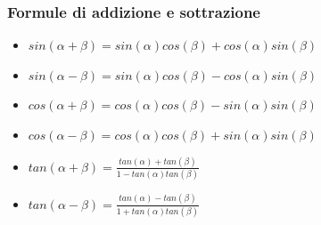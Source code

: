 \documentclass[12pt]{article}
\newenvironment{para}{\begin{adjustwidth}{13mm}{}}{\end{adjustwidth}}
\begin{document}
\begin{para}
\subsubsection{Formule di addizione e sottrazione}
\begin{itemize}
    \item $sin(\alpha + \beta) = sin(\alpha)cos(\beta)+cos(\alpha)sin(\beta)$
    \item $sin(\alpha - \beta) = sin(\alpha)cos(\beta)-cos(\alpha)sin(\beta)$
    \item $cos(\alpha+\beta) = cos(\alpha)cos(\beta)-sin(\alpha)sin(\beta)$
    \item $cos(\alpha-\beta) = cos(\alpha)cos(\beta)+sin(\alpha)sin(\beta)$
    \item $tan(\alpha+\beta) = \frac{tan(\alpha)+tan(\beta)}{1-tan(\alpha)tan(\beta)}$
    \item $tan(\alpha-\beta) = \frac{tan(\alpha)-tan(\beta)}{1+tan(\alpha)tan(\beta)}$
\end{itemize}

\end{para}
\end{document}
